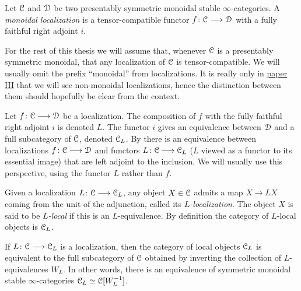 \begin{definition}
    \label{ch0:def:monoidal-localization}
    Let $\EuScript{C}$ and $\EuScript{D}$ be two presentably symmetric monoidal stable $\infty$-categories. A \emph{monoidal localization} is a tensor-compatible functor $f\colon \EuScript{C}\longrightarrow \EuScript{D}$ with a fully faithful right adjoint $i$. 
\end{definition}

\begin{remark}
    \label{ch0:rm:localizations-tensor-compatible}
    For the rest of this thesis we will assume that, whenever $\EuScript{C}$ is a presentably symmetric monoidal, that any localization of $\EuScript{C}$ is tensor-compatible. We will usually omit the prefix ``monoidal'' from localizations. It is really only in \hyperref[ch3]{paper III} that we will see non-monoidal localizations, hence the distinction between them should hopefully be clear from the context.
\end{remark}

\begin{remark}
    Let $f\colon \EuScript{C}\longrightarrow \EuScript{D}$ be a localization. The composition of $f$ with the fully faithful right adjoint $i$ is denoted $L$. The functor $i$ gives an equivalence between $\EuScript{D}$ and a full subcategory of $\EuScript{C}$, denoted $\EuScript{C}_L$. By \cite[5.2.7.4]{lurie_09} there is an equivalence between localizations $f\colon \EuScript{C}\longrightarrow \EuScript{D}$ and functors $L\colon \EuScript{C}\longrightarrow \EuScript{C}_L$ ($L$ viewed as a functor to its essential image) that are left adjoint to the inclusion. We will usually use this perspective, using the functor $L$ rather than $f$. 
\end{remark}

\begin{definition}
    Given a localization $L\colon \EuScript{C}\longrightarrow \EuScript{C}_L$, any object $X\in \EuScript{C}$ admits a map $X\longrightarrow LX$ coming from the unit of the adjunction, called its \emph{$L$-localization}. The object $X$ is said to be \emph{$L$-local} if this is an $L$-equivalence. By definition the category of $L$-local objects is $\EuScript{C}_L$. 
\end{definition}

\begin{proposition}
    If $L\colon \EuScript{C}\longrightarrow \EuScript{C}_L$ is a localization, then the category of local objects $\EuScript{C}_L$ is equivalent to the full subcategory of $\EuScript{C}$ obtained by inverting the collection of $L$-equivalences $W_L$. In other words, there is an equivalence of symmetric monoidal stable $\infty$-categories $\EuScript{C}_L\simeq \EuScript{C}[W_L^{-1}]$.
\end{proposition}

